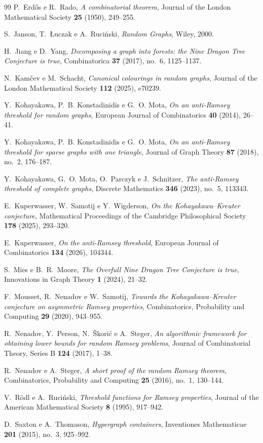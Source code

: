 \documentclass[11pt,a4paper]{article}
\theoremstyle{plain}
\theoremstyle{definition}
\begin{document}
\begin{thebibliography}{99}
  P.~Erd\H{o}s e R.~Rado,
  \emph{A combinatorial theorem},
  Journal of the London Mathematical Society \textbf{25} (1950), 249--255.

  S.~Janson, T.~{\L}uczak e A.~Ruci\'nski,
  \emph{Random Graphs},
  Wiley, 2000.

  H.~Jiang e D.~Yang,
  \emph{Decomposing a graph into forests: the {Nine Dragon Tree} Conjecture is
    true},
  Combinatorica \textbf{37} (2017), no.~6, 1125--1137.

  N.~Kam\v{c}ev e M.~Schacht,
  \emph{Canonical colourings in random graphs},
  Journal of the London Mathematical Society \textbf{112} (2025), e70239.

  Y.~Kohayakawa, P.~B. Konstadinidis e G.~O. Mota,
  \emph{On an anti-Ramsey threshold for random graphs},
  European Journal of Combinatorics \textbf{40} (2014), 26--41.

  Y.~Kohayakawa, P.~B. Konstadinidis e G.~O. Mota,
  \emph{On an anti-Ramsey threshold for sparse graphs with one triangle},
  Journal of Graph Theory \textbf{87} (2018), no.~2, 176--187.

  Y.~Kohayakawa, G.~O. Mota, O.~Parczyk e J.~Schnitzer,
  \emph{The anti-Ramsey threshold of complete graphs},
  Discrete Mathematics \textbf{346} (2023), no.~5, 113343.

  E.~Kuperwasser, W.~Samotij e Y.~Wigderson,
  \emph{On the Kohayakawa--Kreuter conjecture},
  Mathematical Proceedings of the Cambridge Philosophical Society
  \textbf{178} (2025), 293--320.

  E.~Kuperwasser,
  \emph{On the anti-Ramsey threshold},
  European Journal of Combinatorics \textbf{134} (2026), 104344.

  S.~Mies e B.~R.~Moore,
  \emph{The {Overfull Nine Dragon Tree} Conjecture is true},
  Innovations in Graph Theory \textbf{1} (2024), 21--32.

  F.~Mousset, R.~Nenadov e W.~Samotij,
  \emph{Towards the Kohayakawa--Kreuter conjecture on asymmetric Ramsey
    properties},
  Combinatorics, Probability and Computing \textbf{29} (2020), 943--955.

  R.~Nenadov, Y.~Person, N.~\v{S}kori\'c e A.~Steger,
  \emph{An algorithmic framework for obtaining lower bounds for random Ramsey
    problems},
  Journal of Combinatorial Theory, Series B \textbf{124} (2017), 1--38.

  R.~Nenadov e A.~Steger,
  \emph{A short proof of the random {Ramsey} theorem},
  Combinatorics, Probability and Computing \textbf{25} (2016), no.~1, 130--144.

  V.~Rödl e A.~Ruciński,
  \emph{Threshold functions for Ramsey properties},
  Journal of the American Mathematical Society \textbf{8} (1995), 917--942.

  D.~Saxton e A.~Thomason,
  \emph{Hypergraph containers},
  Inventiones Mathematicae \textbf{201} (2015), no.~3, 925--992.

\end{thebibliography}
\end{document}
